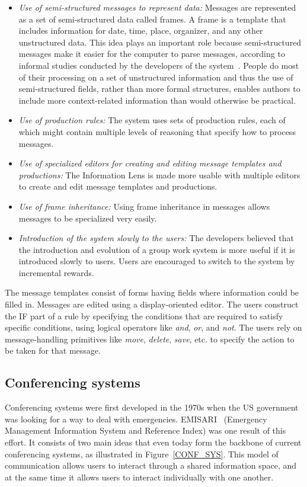 \begin{itemize} 
\item \emph{Use of semi-structured messages to represent data:}
  Messages are represented as a set of semi-structured data called
  frames. A frame is a template that includes information for date,
  time, place, organizer, and any other unstructured data. This idea
  plays an important role because semi-structured messages make it
  easier for the computer to parse messages, according to informal
  studies conducted by the developers of the system~\cite{Malo87a}.
  People do most of their processing on a set of unstructured
  information and thus the use of semi-structured fields, rather than
  more formal structures, enables authors to include more
  context-related information than would otherwise be practical.

\item \emph{Use of production rules:} The system uses sets of
  production rules, each of which might contain multiple levels of
  reasoning that specify how to process messages.

\item \emph{Use of specialized editors for creating and editing
    message templates and productions: } The Information Lens is made
  more usable with multiple editors to create and edit message
  templates and productions.

\item \emph{Use of frame inheritance:} Using frame inheritance in
  messages allows messages to be specialized very easily.

\item \emph{Introduction of the system slowly to the users:} The
  developers believed that the introduction and evolution of a group
  work system is more useful if it is introduced slowly to users.
  Users are encouraged to switch to the system by incremental rewards.
\end{itemize}

The message templates consist of forms having fields where information
could be filled in.  Messages are edited using a display-oriented
editor. The users construct the IF part of a rule by specifying the
conditions that are required to satisfy specific conditions, using
logical operators like {\em and}, {\em or}, and {\em not}. The users
rely on message-handling primitives like {\em move}, {\em delete},
{\em save}, etc. to specify the action to be taken for that message.

\subsection{Conferencing systems}
Conferencing systems were first developed in the 1970s when the US
government was looking for a way to deal with
emergencies. EMISARI~\cite{Hilt78a} (Emergency Management Information
System and Reference Index) was one result of this effort. It consists
of two main ideas that even today form the backbone of current
conferencing systems, as illustrated in Figure~\ref{CONF_SYS}. This
model of communication allows users to interact through a shared
information space, and at the same time it allows users to interact
individually with one another.

